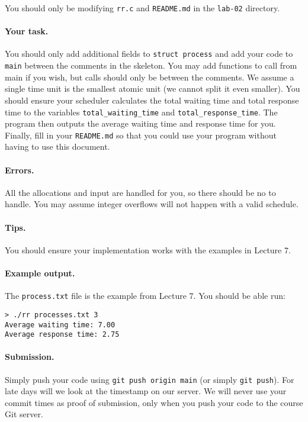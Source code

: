 You should only be modifying \texttt{rr.c} and \texttt{README.md} in the
\texttt{lab-02} directory.

\paragraph{Your task.}

You should only add additional fields to \texttt{struct process} and add your
code to \texttt{main} between the comments in the skeleton. You may add
functions to call from main if you wish, but calls should only be between the
comments. We assume a single time unit is the smallest atomic unit (we cannot
split it even smaller).
You should ensure your scheduler calculates the total waiting time and total
response time to the variables \texttt{total\_waiting\_time} and
\texttt{total\_response\_time}.
The program then outputs the average waiting time and response time for you.
Finally, fill in your \texttt{README.md} so that you could use your program
without having to use this document.

\paragraph{Errors.}

All the allocations and input are handled for you, so there should be no to
handle.
You may assume integer overflows will not happen with a valid schedule.

\paragraph{Tips.}

You should ensure your implementation works with the examples in Lecture 7.

\paragraph{Example output.}

The \texttt{process.txt} file is the example from Lecture 7. You should be able
run:

\begin{lstlisting}
> ./rr processes.txt 3
Average waiting time: 7.00             
Average response time: 2.75
\end{lstlisting}

\paragraph{Submission.}

Simply push your code using \lstinline|git push origin main| (or simply
\lstinline|git push|).
For late days will we look at the timestamp on our server.
We will never use your commit times as proof of submission, only when you
push your code to the course Git server.


